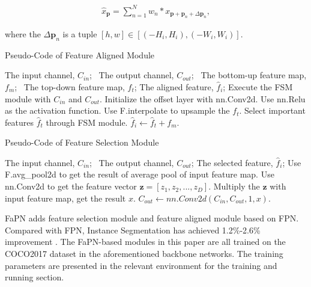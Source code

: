 \begin{equation}
    \begin{aligned}
    \hat{x}_\textbf{p}= \sum_{n = 1}^{N}w_n * x_{\textbf{p}+\textbf{p}_n+\Delta\textbf{p}_n},
    \label{con:famConvolution}
    \end{aligned}
\end{equation}

where the $\Delta\textbf{p}_n$ is a tuple $[h, w] \in [(-H_i, H_i), (-W_i, W_i)]$.

\begin{algorithm}[htbp]
	\caption{Pseudo-Code of Feature Aligned Module} 
	\label{alg1} 
	\begin{algorithmic}
		\REQUIRE 
        The input channel, $C_{in}$;
		\ The output channel, $C_{out}$;
		\ The bottom-up feature map, $f_m$;
		\ The top-down feature map, $f_t$;
		\ENSURE 
        The aligned feature, $\hat{f}_i$;
		\STATE Execute the FSM module with $C_{in}$ and $C_{out}$.
		\STATE Initialize the offset layer with nn.Conv2d.
		\STATE Use nn.Relu as the activation function.
        \STATE Use F.interpolate to upsample the $f_t$.
		\ENDIF 
		\STATE Select important features $\hat{f}_t$ through FSM module.
		\STATE $\hat{f}_i \gets \hat{f}_t + f_m$.

	\end{algorithmic} 
\end{algorithm}

\begin{algorithm}[htbp]
	\caption{Pseudo-Code of Feature Selection Module} 
	\label{alg2} 
	\begin{algorithmic}
		\REQUIRE 
        The input channel, $C_{in}$;
		\ The output channel, $C_{out}$;
		\ENSURE The selected feature, $\hat{f}_i$;
		\STATE Use F.avg\_pool2d to get the result of average pool of input feature map.
		\STATE Use nn.Conv2d to get the feature vector $\textbf{z} =  [z_1, z_2, ..., z_D]$.
		\STATE Multiply the $\textbf{z}$ with input feature map, get the result $x$.
		\STATE $C_{out} \gets nn.Conv2d(C_{in}, C_{out}, 1, x)$. 

	\end{algorithmic} 
\end{algorithm}


FaPN adds feature selection module \cite{hu2018squeeze} and feature aligned module based on FPN. Compared with FPN, Instance Segmentation has achieved 1.2\%-2.6\% improvement \cite{huang2021fapn}. The FaPN-based modules in this paper are all trained on the COCO2017 dataset in the aforementioned backbone networks. The training parameters are presented in the relevant environment for the training and running section.


